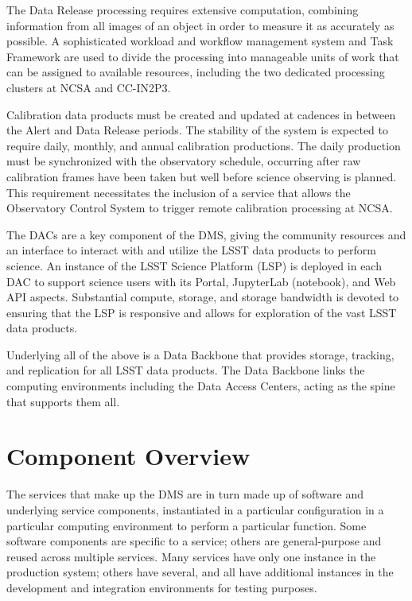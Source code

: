 \documentclass[DM,toc]{lsstdoc}
\begin{document}
The Data Release processing requires extensive computation, combining
information from all images of an object in order to measure it as
accurately as possible.  A sophisticated workload and workflow management
system and Task Framework are used to divide the processing into
manageable units of work that can be assigned to available resources,
including the two dedicated processing clusters at NCSA and CC-IN2P3.

Calibration data products must be created and updated at cadences in between
the Alert and Data Release periods.  The stability of the system is expected to
require daily, monthly, and annual calibration productions.  The daily
production must be synchronized with the observatory schedule, occurring after
raw calibration frames have been taken but well before science observing is
planned.  This requirement necessitates the inclusion of a service that allows
the Observatory Control System to trigger remote calibration processing at
NCSA.

The DACs are a key component of the DMS, giving the community resources and an
interface to interact with and utilize the LSST data products to perform
science.  An instance of the LSST Science Platform (LSP) is deployed in each
DAC to support science users with its Portal, JupyterLab (notebook), and Web
API aspects.  Substantial compute, storage, and storage bandwidth is devoted to
ensuring that the LSP is responsive and allows for exploration of the vast
LSST data products.

Underlying all of the above is a Data Backbone that provides storage, tracking,
and replication for all LSST data products.  The Data Backbone links the
computing environments including the Data Access Centers, acting as the spine that
supports them all.



\section{Component Overview}\label{component-overview}

The services that make up the DMS are in turn made up of software and
underlying service components, instantiated in a particular
configuration in a particular computing environment to perform a
particular function. Some software components are specific to a service;
others are general-purpose and reused across multiple services. Many
services have only one instance in the production system; others have
several, and all have additional instances in the development and
integration environments for testing purposes.
\end{document}
